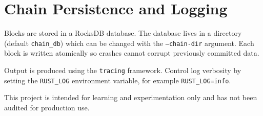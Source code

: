 \chapter{Chain Persistence and Logging}
Blocks are stored in a RocksDB database. The database lives in a directory (default \texttt{chain\_db}) which can be changed with the \texttt{--chain-dir} argument. Each block is written atomically so crashes cannot corrupt previously committed data.

Output is produced using the \texttt{tracing} framework. Control log verbosity by setting the \texttt{RUST\_LOG} environment variable, for example \texttt{RUST\_LOG=info}.

This project is intended for learning and experimentation only and has not been audited for production use.

